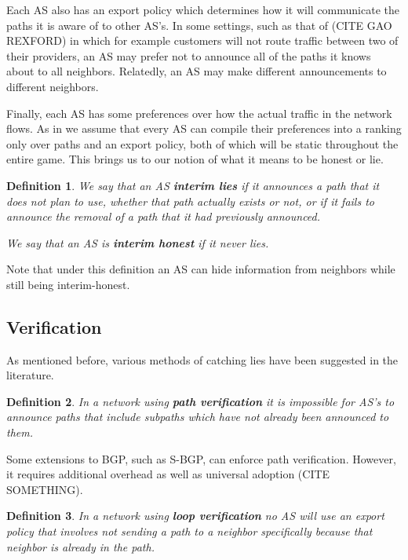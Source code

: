 \documentclass[12pt]{article}
\newtheorem{definition}{Definition}
\begin{document}
Each AS also has an export policy which determines how it will communicate the paths it is aware of to other AS's. In some settings, such as that of (CITE GAO REXFORD) in which for example customers will not route traffic between two of their providers, an AS may prefer not to announce all of the paths it knows about to all neighbors. Relatedly, an AS may make different announcements to different neighbors.

Finally, each AS has some preferences over how the actual traffic in the network flows. As in \cite{Attraction} we assume that every AS can compile their preferences into a ranking only over paths and an export policy, both of which will be static throughout the entire game. This brings us to our notion of what it means to be honest or lie.

\begin{definition}
We say that an AS \textbf{interim lies} if it announces a path that it does not plan to use, whether that path actually exists or not, or if it fails to announce the removal of a path that it had previously announced.

We say that an AS is \textbf{interim honest} if it never lies.
\end{definition}

Note that under this definition an AS can hide information from neighbors while still being interim-honest.

\subsection{Verification}
As mentioned before, various methods of catching lies have been suggested in the literature.

\begin{definition}
In a network using \textbf{path verification} it is impossible for AS's to announce paths that include subpaths which have not already been announced to them.
\end{definition}

Some extensions to BGP, such as S-BGP, can enforce path verification. However, it requires additional overhead as well as universal adoption (CITE SOMETHING).

\begin{definition}
In a network using \textbf{loop verification} no AS will use an export policy that involves not sending a path to a neighbor specifically because that neighbor is already in the path.
\end{definition}
\end{document}
